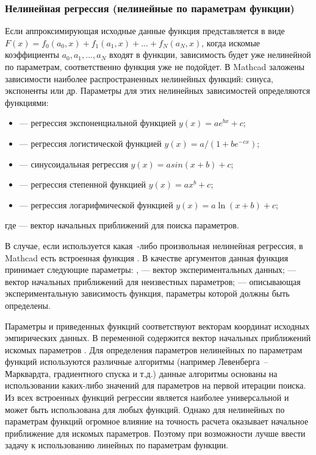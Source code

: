 \subsubsection{Нелинейная регрессия (нелинейные по параметрам функции)}

Если аппроксимирующая исходные данные функция представляется в виде $F(x) = f_0 (a_0, x) + f_1(a_1,x) +... + f_N(a_N,x)$, когда искомые коэффициенты $a_0, a_1, ..., a_N$ входят в функции, зависимость будет уже нелинейной по параметрам, соответственно функция  уже не подойдет.
В Mathcad заложены зависимости наиболее распространенных нелинейных функций: синуса, экспоненты или др. Параметры для этих нелинейных зависимостей определяются функциями: 
\begin{itemize}
	\item {} --- регрессия  экспоненциальной функцией $y(x)=a e^{b x}+c$;
	\item {} --- регрессия логистической функцией $y(x)=a/(1+b e^{-c x})$;
	\item {} --- синусоидальная регрессия $y(x)=a sin(x+b)+c$;
	\item {} --- регрессия степенной функцией $y(x)=a x^b+c$;
	\item {} --- регрессия логарифмической функцией $y(x)=a\ln(x+b)+c$;
\end{itemize}
где  --- вектор начальных приближений для поиска параметров. 

В случае, если используется какая~-либо произвольная нелинейная регрессия,  в Mathcad есть встроенная функция . В качестве аргументов данная функция принимает следующие параметры: ,  --- вектор экспериментальных данных;  --- вектор начальных приближений для неизвестных параметров;
 --- описывающая экспериментальную зависимость функция, параметры  которой должны быть определены.

Параметры  и  приведенных функций соответствуют векторам координат исходных эмпирических данных. В переменной  содержится вектор начальных приближений искомых параметров . Для определения параметров нелинейных по параметрам функций используются различные алгоритмы (например Левенберга~--Марквардта, градиентного спуска и т.д.) данные алгоритмы основаны на использовании каких-либо значений для параметров на первой итерации поиска.
Из всех встроенных функций регрессии  является наиболее универсальной и может быть использована для любых функций. Однако для нелинейных по параметрам функций огромное влияние на точность расчета оказывает начальное приближение   для искомых параметров. Поэтому при возможности лучше ввести задачу к  использованию линейных по параметрам функции.

